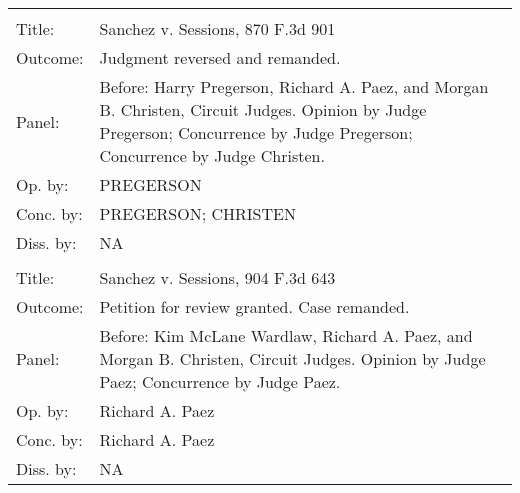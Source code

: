 \documentclass[10pt, letterpaper]{article}
\begin{document}
\begin{spacing}{1.0}
\begin{footnotesize}
\begin{longtable}[H]{lp{6in}}
        \arrayrulecolor{black}\hline\\[-4pt]
        Title: & Sanchez v. Sessions, 870 F.3d 901\\[2pt]
        Outcome: & Judgment reversed and remanded.\\[2pt]
        Panel: & Before: Harry Pregerson, Richard A. Paez, and Morgan B. Christen, Circuit Judges. Opinion by Judge Pregerson; Concurrence by Judge Pregerson; Concurrence by Judge Christen.\\[2pt]
        Op. by: & PREGERSON\\[2pt]
        Conc. by: & PREGERSON; CHRISTEN\\[2pt]
        Diss. by: & NA\\[2pt]
        \arrayrulecolor{gray}\hline\\[-4pt]
        Title: & Sanchez v. Sessions, 904 F.3d 643\\[2pt]
        Outcome: & Petition for review granted. Case remanded.\\[2pt]
        Panel: & Before: Kim McLane Wardlaw, Richard A. Paez, and Morgan B. Christen, Circuit Judges. Opinion by Judge Paez; Concurrence by Judge Paez.\\[2pt]
        Op. by: & Richard A. Paez\\[2pt]
        Conc. by: & Richard A. Paez\\[2pt]
        Diss. by: & NA\\[2pt]
        

\end{longtable}
\end{footnotesize}
\end{spacing}
\end{document}
